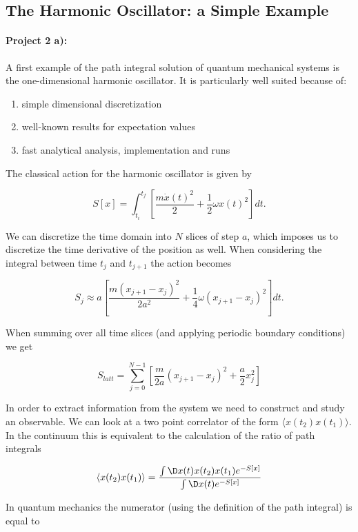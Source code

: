 \documentclass[%
oneside,                 %
final,                   %
10pt]{article}
\begin{document}
\subsection*{The Harmonic Oscillator: a Simple Example}

\paragraph{Project 2 a):}
A first example of the path integral solution of quantum mechanical
systems is the one-dimensional harmonic oscillator. It is particularly
well suited because of:

\begin{enumerate}
\item simple dimensional discretization

\item well-known results for expectation values

\item fast analytical analysis, implementation and runs 
\end{enumerate}

\noindent
The classical action for the harmonic oscillator is given by

\[
	S[x] = \int_{t_i}^{t_f} \left[ \frac{m\dot{x}(t)^2}{2} + \frac{1}{2}\omega x(t)^2\right] dt.
\]

We can discretize the time domain into $N$ slices of step $a$, which
imposes us to discretize the time derivative of the position as
well. When considering the integral between time $t_j$ and $t_{j+1}$
the action becomes

\[
	S_{j} \approx a\left[ \frac{m(x_{j+1}-x_j)^2}{2a^2} + \frac{1}{4}\omega (x_{j+1} - x_j)^2 \right] dt.
\]

When summing over all time slices (and applying periodic boundary conditions) we get

\[	
	S_{latt} = \sum_{j = 0}^{N-1} \left[ \frac{m}{2a}(x_{j+1}-x_j)^2 + \frac{a}{2} x_j^2 \right]
\]

In order to extract information from the system we need to construct
and study an observable. We can look at a two point correlator of the
form $\langle x(t_2)x(t_1) \rangle$.  In the continuum this is
equivalent to the calculation of the ratio of path integrals

\[
	\langle x(t_2)x(t_1) \rangle = \frac{\int \D x(t) x(t_2) x(t_1) e^{-S[x]}}{\int \D x(t) e^{-S[x]}}
\]

In quantum mechanics the numerator (using the definition of the path integral) is equal to
\end{document}
